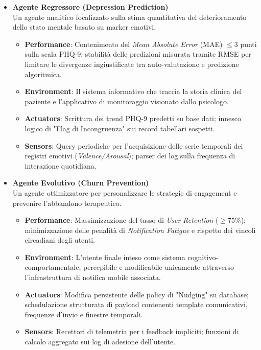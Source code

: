 \begin{itemize}
          \vspace{0.3cm}
    \item \textbf{Agente Regressore (Depression Prediction)} \\
          Un agente analitico focalizzato sulla stima quantitativa del deterioramento dello stato mentale basato su marker emotivi.
          \begin{itemize}
              \item \textbf{Performance}: Contenimento del \textit{Mean Absolute Error} (MAE) $\le 3$ punti sulla scala PHQ-9; stabilità delle predizioni misurata tramite RMSE per limitare le divergenze ingiustificate tra auto-valutazione e predizione algoritmica.
              \item \textbf{Environment}: Il sistema informativo che traccia la storia clinica del paziente e l'applicativo di monitoraggio visionato dallo psicologo.
              \item \textbf{Actuators}: Scrittura dei trend PHQ-9 predetti su base dati; innesco logico di "Flag di Incongruenza" sui record tabellari sospetti.
              \item \textbf{Sensors}: Query periodiche per l'acquisizione delle serie temporali dei registri emotivi (\textit{Valence/Arousal}); parser dei log sulla frequenza di interazione quotidiana.
          \end{itemize}

          \vspace{0.3cm}
    \item \textbf{Agente Evolutivo (Churn Prevention)} \\
          Un agente ottimizzatore per personalizzare le strategie di engagement e prevenire l’abbandono terapeutico.
          \begin{itemize}
              \item \textbf{Performance}: Massimizzazione del tasso di \textit{User Retention} ($\ge 75\%$); minimizzazione delle penalità di \textit{Notification Fatigue} e rispetto dei vincoli circadiani degli utenti.
              \item \textbf{Environment}: L'utente finale inteso come sistema cognitivo-comportamentale, percepibile e modificabile unicamente attraverso l'infrastruttura di notifica mobile associata.
              \item \textbf{Actuators}: Modifica persistente delle policy di "Nudging" su database; schedulazione strutturata di payload contenenti template comunicativi, frequenze d'invio e finestre temporali.
              \item \textbf{Sensors}: Recettori di telemetria per i feedback impliciti; funzioni di calcolo aggregato sui log di adesione dell'utente.
          \end{itemize}
\end{itemize}

